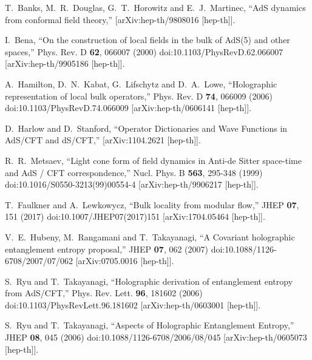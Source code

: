 \documentclass[a4paper,12pt]{article}
\begin{document}
\begin{thebibliography}{}
T.~Banks, M.~R.~Douglas, G.~T.~Horowitz and E.~J.~Martinec,
``AdS dynamics from conformal field theory,''
[arXiv:hep-th/9808016 [hep-th]].

I.~Bena,
``On the construction of local fields in the bulk of AdS(5) and other spaces,''
Phys. Rev. D \textbf{62}, 066007 (2000)
doi:10.1103/PhysRevD.62.066007
[arXiv:hep-th/9905186 [hep-th]].

A.~Hamilton, D.~N.~Kabat, G.~Lifschytz and D.~A.~Lowe,
``Holographic representation of local bulk operators,''
Phys. Rev. D \textbf{74}, 066009 (2006)
doi:10.1103/PhysRevD.74.066009
[arXiv:hep-th/0606141 [hep-th]].

D.~Harlow and D.~Stanford,
``Operator Dictionaries and Wave Functions in AdS/CFT and dS/CFT,''
[arXiv:1104.2621 [hep-th]].
 
R.~R.~Metsaev,
``Light cone form of field dynamics in Anti-de Sitter space-time and AdS / CFT correspondence,''
Nucl. Phys. B \textbf{563}, 295-348 (1999)
doi:10.1016/S0550-3213(99)00554-4
[arXiv:hep-th/9906217 [hep-th]].

T.~Faulkner and A.~Lewkowycz,
``Bulk locality from modular flow,''
JHEP \textbf{07}, 151 (2017)
doi:10.1007/JHEP07(2017)151
[arXiv:1704.05464 [hep-th]].

V.~E.~Hubeny, M.~Rangamani and T.~Takayanagi,
``A Covariant holographic entanglement entropy proposal,''
JHEP \textbf{07}, 062 (2007)
doi:10.1088/1126-6708/2007/07/062
[arXiv:0705.0016 [hep-th]].

S.~Ryu and T.~Takayanagi,
``Holographic derivation of entanglement entropy from AdS/CFT,''
Phys. Rev. Lett. \textbf{96}, 181602 (2006)
doi:10.1103/PhysRevLett.96.181602
[arXiv:hep-th/0603001 [hep-th]].

S.~Ryu and T.~Takayanagi,
``Aspects of Holographic Entanglement Entropy,''
JHEP \textbf{08}, 045 (2006)
doi:10.1088/1126-6708/2006/08/045
[arXiv:hep-th/0605073 [hep-th]].


\end{thebibliography}
\end{document}
